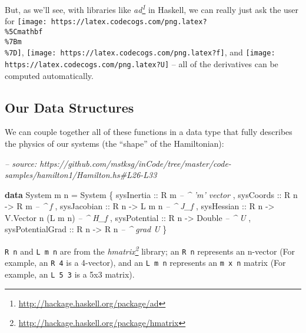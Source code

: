 \documentclass[]{article}
\newenvironment{Shaded}{}{}
\newcommand{\CommentTok}[1]{\textcolor[rgb]{0.38,0.63,0.69}{\textit{#1}}}
\newcommand{\DataTypeTok}[1]{\textcolor[rgb]{0.56,0.13,0.00}{#1}}
\newcommand{\FunctionTok}[1]{\textcolor[rgb]{0.02,0.16,0.49}{#1}}
\newcommand{\KeywordTok}[1]{\textcolor[rgb]{0.00,0.44,0.13}{\textbf{#1}}}
\newcommand{\NormalTok}[1]{#1}
\newcommand{\OtherTok}[1]{\textcolor[rgb]{0.00,0.44,0.13}{#1}}
\renewcommand{\href}[2]{#2\footnote{\url{#1}}}
\begin{document}
But, as we'll see, with libraries like
\emph{\href{http://hackage.haskell.org/package/ad}{ad}} in Haskell, we can
really just ask the user for
\texttt{[image: https://latex.codecogs.com/png.latex?\\\%5Cmathbf\\\%7Bm\\\%7D]},
\texttt{[image: https://latex.codecogs.com/png.latex?f]}, and
\texttt{[image: https://latex.codecogs.com/png.latex?U]} -- all of the
derivatives can be computed automatically.

\hypertarget{our-data-structures}{%
\subsection{Our Data Structures}\label{our-data-structures}}

We can couple together all of these functions in a data type that fully
describes the physics of our systems (the ``shape'' of the Hamiltonian):

\begin{Shaded}
\begin{Highlighting}[]
\CommentTok{-- source: https://github.com/mstksg/inCode/tree/master/code-samples/hamilton1/Hamilton.hs#L26-L33}

\KeywordTok{data} \DataTypeTok{System}\NormalTok{ m n }\FunctionTok{=} \DataTypeTok{System}
\NormalTok{    \{}\OtherTok{ sysInertia       ::} \DataTypeTok{R}\NormalTok{ m                         }\CommentTok{-- ^ 'm' vector}
\NormalTok{    ,}\OtherTok{ sysCoords        ::} \DataTypeTok{R}\NormalTok{ n }\OtherTok{->} \DataTypeTok{R}\NormalTok{ m                  }\CommentTok{-- ^ f}
\NormalTok{    ,}\OtherTok{ sysJacobian      ::} \DataTypeTok{R}\NormalTok{ n }\OtherTok{->} \DataTypeTok{L}\NormalTok{ m n                }\CommentTok{-- ^ J_f}
\NormalTok{    ,}\OtherTok{ sysHessian       ::} \DataTypeTok{R}\NormalTok{ n }\OtherTok{->} \DataTypeTok{V.Vector}\NormalTok{ n (}\DataTypeTok{L}\NormalTok{ m n)   }\CommentTok{-- ^ H_f}
\NormalTok{    ,}\OtherTok{ sysPotential     ::} \DataTypeTok{R}\NormalTok{ n }\OtherTok{->} \DataTypeTok{Double}               \CommentTok{-- ^ U}
\NormalTok{    ,}\OtherTok{ sysPotentialGrad ::} \DataTypeTok{R}\NormalTok{ n }\OtherTok{->} \DataTypeTok{R}\NormalTok{ n                  }\CommentTok{-- ^ grad U}
\NormalTok{    \}}
\end{Highlighting}
\end{Shaded}

\texttt{R\ n} and \texttt{L\ m\ n} are from the
\emph{\href{http://hackage.haskell.org/package/hmatrix}{hmatrix}} library; an
\texttt{R\ n} represents an n-vector (For example, an \texttt{R\ 4} is a
4-vector), and an \texttt{L\ m\ n} represents an \texttt{m\ x\ n} matrix (For
example, an \texttt{L\ 5\ 3} is a 5x3 matrix).
\end{document}
